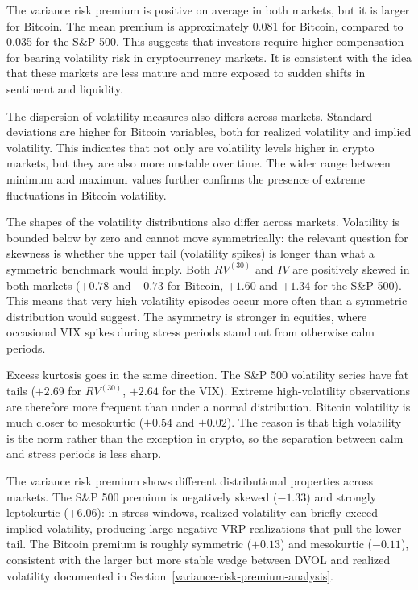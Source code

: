 \documentclass[11pt,a4paper,openany]{report}
\begin{document}
The variance risk premium is positive on average in both markets, but it
is larger for Bitcoin. The mean premium is approximately 0.081 for
Bitcoin, compared to 0.035 for the S\&P 500. This suggests that
investors require higher compensation for bearing volatility risk in
cryptocurrency markets. It is consistent with the idea that these
markets are less mature and more exposed to sudden shifts in sentiment
and liquidity.

The dispersion of volatility measures also differs across markets.
Standard deviations are higher for Bitcoin variables, both for realized
volatility and implied volatility. This indicates that not only are
volatility levels higher in crypto markets, but they are also more
unstable over time. The wider range between minimum and maximum values
further confirms the presence of extreme fluctuations in Bitcoin
volatility.

The shapes of the volatility distributions also differ across markets.
Volatility is bounded below by zero and cannot move symmetrically: the
relevant question for skewness is whether the upper tail (volatility
spikes) is longer than what a symmetric benchmark would imply. Both $RV^{(30)}$ and $IV$ are positively skewed in both markets
($+0.78$ and $+0.73$ for Bitcoin, $+1.60$ and $+1.34$ for the S\&P
500). This means that very high volatility episodes occur more often
than a symmetric distribution would suggest. The asymmetry is stronger
in equities, where occasional VIX spikes during stress periods stand
out from otherwise calm periods.

Excess kurtosis goes in the same direction. The S\&P 500 volatility
series have fat tails ($+2.69$ for $RV^{(30)}$, $+2.64$ for the VIX).
Extreme high-volatility observations are therefore more frequent than
under a normal distribution. Bitcoin volatility is much closer to
mesokurtic ($+0.54$ and $+0.02$). The reason is that high volatility
is the norm rather than the exception in crypto, so the separation
between calm and stress periods is less sharp.

The variance risk premium shows different distributional properties
across markets. The S\&P 500 premium is negatively skewed ($-1.33$) and
strongly leptokurtic ($+6.06$): in stress windows, realized volatility
can briefly exceed implied volatility, producing large negative VRP
realizations that pull the lower tail. The Bitcoin premium is roughly
symmetric ($+0.13$) and mesokurtic ($-0.11$), consistent with the
larger but more stable wedge between DVOL and realized volatility
documented in Section~\ref{variance-risk-premium-analysis}.
\end{document}
